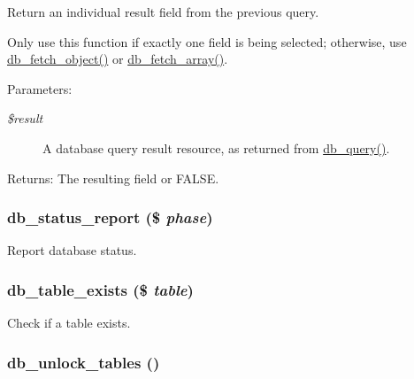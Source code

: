Return an individual result field from the previous query.

Only use this function if exactly one field is being selected; otherwise, use \hyperlink{database_8mysql_8inc_5faaeba7105d28828db453b4fd3c75d4}{db\_\-fetch\_\-object()} or \hyperlink{database_8mysql_8inc_2bd5f98fec7f21ee2c37f6b83785dcb9}{db\_\-fetch\_\-array()}.

\begin{Desc}
\item[Parameters:]
\begin{description}
\item[{\em \$result}]A database query result resource, as returned from \hyperlink{database_8mysql-common_8inc_9e096321b86945d128746ac7bedce8f3}{db\_\-query()}. \end{description}
\end{Desc}
\begin{Desc}
\item[Returns:]The resulting field or FALSE. \end{Desc}
\hypertarget{database_8mysql_8inc_497d9afd8edb209108db34ea159c77ca}{
\subsubsection[{db\_\-status\_\-report}]{\setlength{\rightskip}{0pt plus 5cm}db\_\-status\_\-report (\$ {\em phase})}}
\label{database_8mysql_8inc_497d9afd8edb209108db34ea159c77ca}


Report database status. \hypertarget{database_8mysql_8inc_78809300cee80db034832825aed55b70}{
\subsubsection[{db\_\-table\_\-exists}]{\setlength{\rightskip}{0pt plus 5cm}db\_\-table\_\-exists (\$ {\em table})}}
\label{database_8mysql_8inc_78809300cee80db034832825aed55b70}


Check if a table exists. \hypertarget{database_8mysql_8inc_827df02252c1d606c685b768807b7181}{
\subsubsection[{db\_\-unlock\_\-tables}]{\setlength{\rightskip}{0pt plus 5cm}db\_\-unlock\_\-tables ()}}
\label{database_8mysql_8inc_827df02252c1d606c685b768807b7181}


